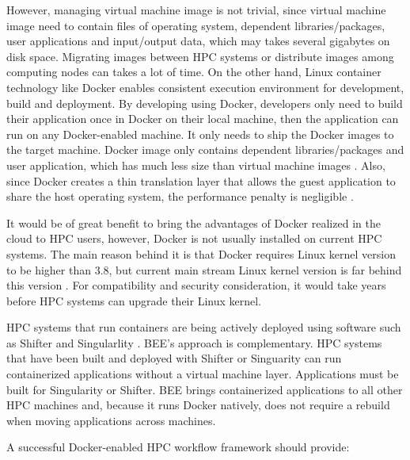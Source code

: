 However, managing virtual machine image is not trivial, since virtual machine image need to contain files of operating system, dependent libraries/packages, user applications and input/output data, which may takes several gigabytes on disk space. Migrating images between HPC systems or distribute images among computing nodes can takes a lot of time. On the other hand, Linux container technology like Docker \cite{Docker} \cite{awscontainer} enables consistent execution environment for development, build and deployment. By developing using Docker, developers only need to build their application once in Docker on their local machine, then the application can run on any Docker-enabled machine. It only needs to ship the Docker images to the target machine. Docker image only contains dependent libraries/packages and user application, which has much less size than virtual machine images \cite{boettiger2015introduction}. Also, since Docker creates a thin translation layer that allows the guest application to share the host operating system, the performance penalty is negligible \cite{merkel2014docker, ruan2016performance}.

It would be of great benefit to bring the advantages of Docker realized in the cloud to HPC users, however, Docker is not usually installed on current HPC systems. The main reason behind it is that Docker requires Linux kernel version to be higher than 3.8, but current main stream Linux kernel version is far behind this version \cite{harji2013our}. For compatibility and security consideration, it would take years before HPC systems can upgrade their Linux kernel. 

HPC systems that run containers are being actively deployed using software such as Shifter \cite{jacobsen2015contain} and Singularlity \cite{kurtzer_2016_60736}. BEE's approach is complementary.  HPC systems that have been built and deployed with Shifter or Singuarity can run containerized applications without a virtual machine layer.  Applications must be built for Singularity or Shifter.  BEE brings containerized applications to all other HPC machines and, because it runs Docker natively, does not require a rebuild when moving applications across machines.


A successful Docker-enabled HPC workflow framework should provide:

